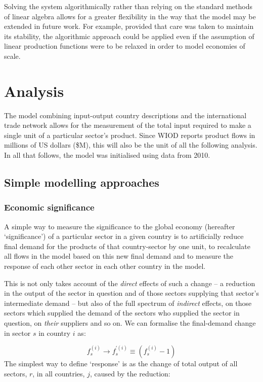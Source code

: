 \documentclass[a4paper]{article}
\begin{document}
Solving the system algorithmically rather than relying on the standard methods of linear algebra allows for a greater flexibility in the way that the model may be extended in future work. For example, provided that care was taken to maintain its stability, the algorithmic approach could be applied even if the assumption of linear production functions were to be relaxed in order to model economies of scale.


\section{Analysis}\label{sec:analysis}
The model combining input-output country descriptions and the international trade network allows for the measurement of the total input required to make a single unit of a particular sector's product.
Since WIOD reports product flows in millions of US dollars (\$M), this will also be the unit of all the following analysis.
In all that follows, the model was initialised using data from 2010.

\subsection{Simple modelling approaches}
\label{sec:simple_modelling_approaches}

\subsubsection*{Economic significance}
A simple way to measure the significance to the global economy (hereafter `significance') of a particular sector in a given country is to artificially reduce final demand for the products of that country-sector by one unit, to recalculate all flows in the model based on this new final demand and to measure the response of each other sector in each other country in the model.

This is not only takes account of the \textit{direct} effects of such a change -- a reduction in the output of the sector in question and of those sectors supplying that sector's intermediate demand -- but also of the full spectrum of \textit{indirect} effects, on those sectors which supplied the demand of the sectors who supplied the sector in question, on \textit{their} suppliers and so on.
We can formalise the final-demand change in sector $s$ in country $i$ as:

\begin{equation}\label{eqn:reduce_fd_by_one}
    f_s^{(i)} \rightarrow f_s^{\prime (i)} \equiv (f_s^{(i)} - 1)
\end{equation}
The simplest way to define `response' is as the change of total output of all sectors, $r$, in all countries, $j$, caused by the reduction:
\end{document}
